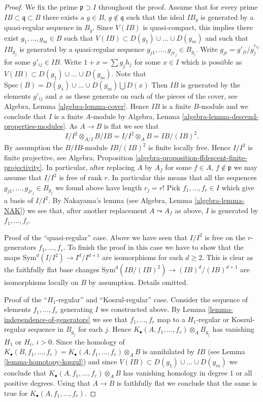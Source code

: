 \begin{proof}
We fix the prime $\mathfrak p \supset I$ throughout the proof.
Assume that for every prime $IB \subset \mathfrak q \subset B$ there
exists a $g \in B$, $g \not \in \mathfrak q$ such that the ideal $IB_g$
is generated by a quasi-regular sequence in $B_g$.
Since $V(IB)$ is quasi-compact, this implies there exist
$g_1, \ldots, g_m \in B$ such that
$V(IB) \subset D(g_1) \cup \ldots \cup D(g_m)$
and such that $IB_{g_j}$ is generated by a quasi-regular sequence
$g_{j1}, \ldots, g_{jr_j} \in B_{g_j}$. Write $g_{ji} = g'_{ji}/g_j^{e_{ij}}$
for some $g'_{ij} \in IB$. Write $1 + x = \sum g_j h_j$
for some $x \in I$ which is possible as
$V(IB) \subset D(g_1) \cup \ldots \cup D(g_m)$.
Note that $\text{Spec}(B) = D(g_1) \cup \ldots \cup D(g_m) \bigcup D(x)$
Then $IB$ is generated by the elements $g'_{ij}$ and $x$ as
these generate on each of the pieces of the cover, see
Algebra, Lemma \ref{algebra-lemma-cover}.
Hence $IB$ is a finite $B$-module and we conclude that $I$ is
a finite $A$-module by
Algebra, Lemma \ref{algebra-lemma-descend-properties-modules}.
As $A \to B$ is flat we see that
$$
I/I^2 \otimes_{A/I} B/IB = I/I^2 \otimes_A B = IB/(IB)^2.
$$
By assumption the $B/IB$-module $IB/(IB)^2$ is finite locally free.
Hence $I/I^2$ is finite projective, see
Algebra, Proposition \ref{algebra-proposition-ffdescent-finite-projectivity}.
In particular, after replacing $A$ by $A_f$ for some
$f \in A$, $f \not \in \mathfrak p$ we may assume that $I/I^2$ is free of
rank $r$. In particular this means that all the sequences
$g_{j1}, \ldots, g_{jr_j} \in B_{g_j}$ we found above
have length $r_j = r$! Pick $f_1, \ldots, f_r \in I$ which
give a basis of $I/I^2$. By Nakayama's lemma (see
Algebra, Lemma \ref{algebra-lemma-NAK})
we see that, after another replacement $A \leadsto A_f$ as above,
$I$ is generated by $f_1, \ldots, f_r$.

\medskip\noindent
Proof of the ``quasi-regular'' case. Above we have seen that
$I/I^2$ is free on the $r$-generators $f_1, \ldots, f_r$.
To finish the proof in this case we have to show that the maps
$\text{Sym}^d(I/I^2) \to I^d/I^{d + 1}$ are isomorphisms
for each $d \geq 2$. This is clear as the faithfully flat
base changes $\text{Sym}^d(IB/(IB)^2) \to (IB)^d/(IB)^{d + 1}$
are isomorphisms locally on $B$ by assumption.
Details omitted.

\medskip\noindent
Proof of the ``$H_1$-regular'' and ``Koszul-regular'' case.
Consider the sequence of elements $f_1, \ldots, f_r$ generating
$I$ we constructed above. By
Lemma \ref{lemma-independence-of-generators}
we see that $f_1, \ldots, f_r$ map to a $H_1$-regular or Koszul-regular
sequence in $B_{g_j}$ for each $j$. Hence
$K_\bullet(A, f_1, \ldots, f_r) \otimes_A B_{g_j}$ has vanishing
$H_1$ or $H_i$, $i > 0$.
Since the homology of
$K_\bullet(B, f_1, \ldots, f_r) = K_\bullet(A, f_1, \ldots, f_r) \otimes_A B$
is annihilated by $IB$ (see
Lemma \ref{lemma-homotopy-koszul})
and since $V(IB) \subset D(g_1) \cup \ldots \cup D(g_m)$ we conclude that
$K_\bullet(A, f_1, \ldots, f_r) \otimes_A B$ has vanishing homology in
degree $1$ or all positive degrees. Using that $A \to B$ is faithfully
flat we conclude that the same is true for
$K_\bullet(A, f_1, \ldots, f_r)$.
\end{proof}


